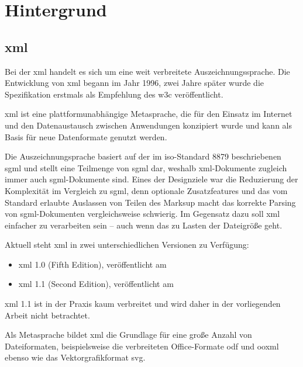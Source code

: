 \chapter{Hintergrund}
\label{chap:background}

\section{\acrfull{xml}}
\label{sec:xml}

Bei der \acrfull{xml} handelt es sich um eine weit verbreitete Auszeichnungssprache. Die Entwicklung von \acrshort{xml} begann im Jahr 1996, zwei Jahre später wurde die Spezifikation erstmals als Empfehlung des \acrshort{w3c} veröffentlicht.

\acrshort{xml} ist eine plattformunabhängige Metasprache, die für den Einsatz im Internet und den Datenaustausch zwischen Anwendungen konzipiert wurde und kann als Basis für neue Datenformate genutzt werden.

Die Auszeichnungsprache basiert auf der im \acrshort{iso}-Standard 8879 beschriebenen \acrfull{sgml} und stellt eine Teilmenge von \acrshort{sgml} dar, weshalb \acrshort{xml}-Dokumente zugleich immer auch \acrshort{sgml}-Dokumente sind. Eines der Designziele war die Reduzierung der Komplexität im Vergleich zu \acrshort{sgml}, denn optionale Zusatzfeatures und das vom Standard erlaubte Auslassen von Teilen des Marksup macht das korrekte Parsing von \acrshort{sgml}-Dokumenten vergleichsweise schwierig. Im Gegensatz dazu soll \acrshort{xml} einfacher zu verarbeiten sein -- auch wenn das zu Lasten der Dateigröße geht.~\cite[Abschnitt 1.1]{maler2008xml,bray1998axml}

Aktuell steht \acrshort{xml} in zwei unterschiedlichen Versionen zu Verfügung:
\begin{itemize}
    \item{} \acrshort{xml} 1.0 (Fifth Edition), veröffentlicht am 
    \item{} \acrshort{xml} 1.1 (Second Edition), veröffentlicht am 
\end{itemize}

\acrshort{xml} 1.1 ist in der Praxis kaum verbreitet und wird daher in der vorliegenden Arbeit nicht betrachtet.

Als Metasprache bildet \acrshort{xml} die Grundlage für eine große Anzahl von Dateiformaten, beispielsweise die verbreiteten Office-Formate \gls{odf} und \gls{ooxml} ebenso wie das Vektorgrafikformat \gls{svg}.

